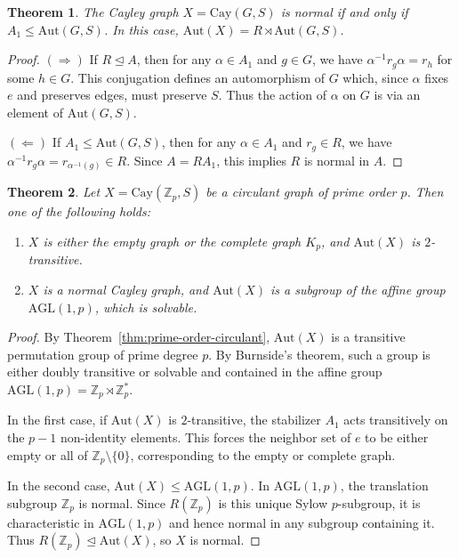 \documentclass[12pt,a4paper,openany]{book}
\newtheorem{theorem}{Theorem}[section]
\begin{document}
\begin{theorem}\label{thm:normal-criterion}
The Cayley graph $X = \mathrm{Cay}(G, S)$ is normal if and only if $A_1 \le \mathrm{Aut}(G,S)$. In this case, $\mathrm{Aut}(X) = R \rtimes \mathrm{Aut}(G,S)$.
\end{theorem}
\begin{proof}
$(\Rightarrow)$ If $R \trianglelefteq A$, then for any $\alpha \in A_1$ and $g \in G$, we have $\alpha^{-1} r_g \alpha = r_h$ for some $h \in G$. This conjugation defines an automorphism of $G$ which, since $\alpha$ fixes $e$ and preserves edges, must preserve $S$. Thus the action of $\alpha$ on $G$ is via an element of $\mathrm{Aut}(G,S)$.

$(\Leftarrow)$ If $A_1 \le \mathrm{Aut}(G,S)$, then for any $\alpha \in A_1$ and $r_g \in R$, we have $\alpha^{-1} r_g \alpha = r_{\alpha^{-1}(g)} \in R$. Since $A = R A_1$, this implies $R$ is normal in $A$.
\end{proof}

\begin{theorem}\label{thm:prime-circulant-classification}
Let $X = \mathrm{Cay}(\mathbb{Z}_p, S)$ be a circulant graph of prime order $p$. Then one of the following holds:
\begin{enumerate}
    \item $X$ is either the empty graph or the complete graph $K_p$, and $\mathrm{Aut}(X)$ is $2$-transitive.
    \item $X$ is a normal Cayley graph, and $\mathrm{Aut}(X)$ is a subgroup of the affine group $\mathrm{AGL}(1,p)$, which is solvable.
\end{enumerate}
\end{theorem}
\begin{proof}
By Theorem~\ref{thm:prime-order-circulant}, $\mathrm{Aut}(X)$ is a transitive permutation group of prime degree $p$. By Burnside's theorem, such a group is either doubly transitive or solvable and contained in the affine group $\mathrm{AGL}(1,p) = \mathbb{Z}_p \rtimes \mathbb{Z}_p^*$.

In the first case, if $\mathrm{Aut}(X)$ is $2$-transitive, the stabilizer $A_1$ acts transitively on the $p-1$ non-identity elements. This forces the neighbor set of $e$ to be either empty or all of $\mathbb{Z}_p \setminus \{0\}$, corresponding to the empty or complete graph.

In the second case, $\mathrm{Aut}(X) \le \mathrm{AGL}(1,p)$. In $\mathrm{AGL}(1,p)$, the translation subgroup $\mathbb{Z}_p$ is normal. Since $R(\mathbb{Z}_p)$ is this unique Sylow $p$-subgroup, it is characteristic in $\mathrm{AGL}(1,p)$ and hence normal in any subgroup containing it. Thus $R(\mathbb{Z}_p) \trianglelefteq \mathrm{Aut}(X)$, so $X$ is normal.
\end{proof}
\end{document}
